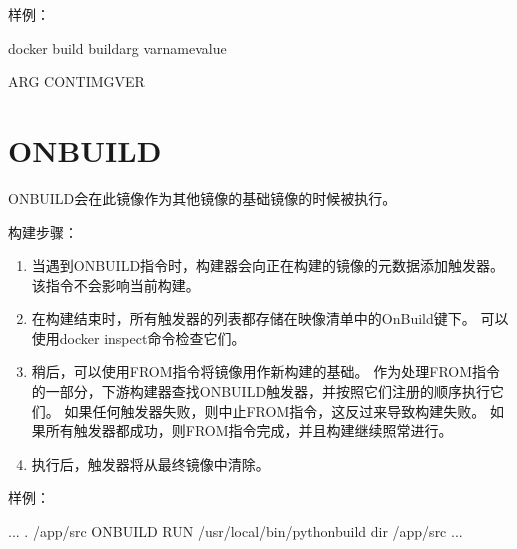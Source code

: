 \documentclass[letterpaper,10pt,english]{sphinxmanual}
\begin{document}
样例：

%
\begin{sphinxVerbatim}[commandchars=\\\{\}]
docker build \PYGZhy{}\PYGZhy{}build\PYGZhy{}arg \PYGZlt{}varname\PYGZgt{}\PYGZlt{}value\PYGZgt{}
\end{sphinxVerbatim}

%
\begin{sphinxVerbatim}[commandchars=\\\{\}]
ARG CONT\PYGZus{}IMG\PYGZus{}VER
  
\end{sphinxVerbatim}


\section{ONBUILD}
\label{\detokenize{_u8fd0_u884c_u5e94_u7528/05-dockerfile_u53c2_u8003:onbuild}}
ONBUILD会在此镜像作为其他镜像的基础镜像的时候被执行。

构建步骤：
\begin{enumerate}
\item {} 
当遇到ONBUILD指令时，构建器会向正在构建的镜像的元数据添加触发器。 该指令不会影响当前构建。

\item {} 
在构建结束时，所有触发器的列表都存储在映像清单中的OnBuild键下。 可以使用docker inspect命令检查它们。

\item {} 
稍后，可以使用FROM指令将镜像用作新构建的基础。 作为处理FROM指令的一部分，下游构建器查找ONBUILD触发器，并按照它们注册的顺序执行它们。
如果任何触发器失败，则中止FROM指令，这反过来导致构建失败。 如果所有触发器都成功，则FROM指令完成，并且构建继续照常进行。

\item {} 
执行后，触发器将从最终镜像中清除。

\end{enumerate}

样例：

%
\begin{sphinxVerbatim}[commandchars=\\\{\}]
\PYG{o}{[}...\PYG{o}{]}
 . /app/src
ONBUILD RUN /usr/local/bin/python\PYGZhy{}build \PYGZhy{}\PYGZhy{}dir /app/src
\PYG{o}{[}...\PYG{o}{]}
\end{sphinxVerbatim}
\end{document}
